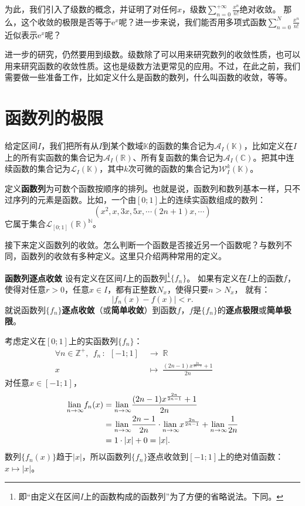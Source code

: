 \documentclass[12pt,UTF8,fontset=none]{ctexbook}
\begin{document}
为此，我们引入了级数的概念，并证明了对任何$x$，级数$\sum_{n=0}^{+\infty}\frac{x^{n}}{n!}$绝对收敛。
那么，这个收敛的极限是否等于$\mathrm{e}^x$呢？进一步来说，我们能否用多项式函数$\sum_{n=0}^N\frac{x^{n}}{n!}$
近似表示$\mathrm{e}^x$呢？

进一步的研究，仍然要用到级数。级数除了可以用来研究数列的收敛性质，也可以用来研究函数的收敛性质。这也是级数方法更常见的应用。不过，在此之前，我们需要做一些准备工作，比如定义什么是函数的数列，什么叫函数的收敛，等等。

\section{函数列的极限}

给定区间$I$，我们把所有从$I$到某个数域$\mathbb{K}$的函数的集合记为$\mathcal{A}_I(\mathbb{K})$，比如定义在$I$上的所有实函数的集合记为$\mathcal{A}_I(\mathbb{R})$、所有复函数的集合记为$\mathcal{A}_I(\mathbb{C})$。把其中连续函数的集合记为$\mathcal{L}_I(\mathbb{K})$，其中$k$次可微的函数的集合记为$\mathcal{W}_I^k(\mathbb{K})$。

定义\textbf{函数列}为可数个函数按顺序的排列。也就是说，函数列和数列基本一样，只不过序列的元素是函数。比如，一个由$[0;1]$上的连续实函数组成的数列：
$$ (x^2, x, 3x, 5x, \cdots (2n+1)x, \cdots )$$
它属于集合$\mathcal{L}_{[0;1]}(\mathbb{R})^{\mathbb{N}}$。

接下来定义函数列的收敛。怎么判断一个函数是否接近另一个函数呢？与数列不同，函数列的收敛有多种定义。这里只介绍两种常用的定义。
\begin{df}{\textbf{函数列逐点收敛}}
    设有定义在区间$I$上的函数列\footnote{即“由定义在区间$I$上的函数构成的函数列”为了方便的省略说法。下同。}$\{f_n\}$。
    如果有定义在$I$上的函数$f$，使得对任意$r>0$，任意$x\in I$，都有正整数$N_x$，使得只要$n>N_x$，
    就有：
    $$ |f_n(x) - f(x) | < r.$$
    就说函数列$\{f_n\}$\textbf{逐点收敛}（或\textbf{简单收敛}）到函数$f$，$f$是$\{f_n\}$的\textbf{逐点极限}或\textbf{简单极限}。
\end{df}

\begin{ex}
    考虑定义在$[0;1]$上的实函数列$\{f_n\}$：
    \begin{align*}
        \forall n\in \mathbb{Z}^+, \;\, f_n \,: \,\; [-1;1]\; &\rightarrow \; \mathbb{R} \\
        x \;&\mapsto \; \frac{(2n-1)x^{\frac{2n}{2n-1}} + 1}{2n} \qquad\qquad\phantom{9} 
    \end{align*}
    对任意$x\in [-1;1]$，
    \begin{align*}
        \underset{n\to\infty}{\operatorname{lian}\,}f_n(x) &= \underset{n\to\infty}{\operatorname{lian}\,} \frac{(2n-1)x^{\frac{2n}{2n-1}} + 1}{2n} \\
        &= \underset{n\to\infty}{\operatorname{lian}\,} \frac{2n-1}{2n} \cdot\underset{n\to\infty}{\operatorname{lian}\,} x^{\frac{2n}{2n-1}} + \underset{n\to\infty}{\operatorname{lian}\,} \frac{1}{2n} \\
        &= 1 \cdot |x| + 0 = |x|. 
    \end{align*}
    数列$\{f_n(x)\}$趋于$|x|$，所以函数列$\{f_n\}$逐点收敛到$[-1;1]$上的绝对值函数：$x\mapsto |x|$。
\end{ex}
\end{document}
